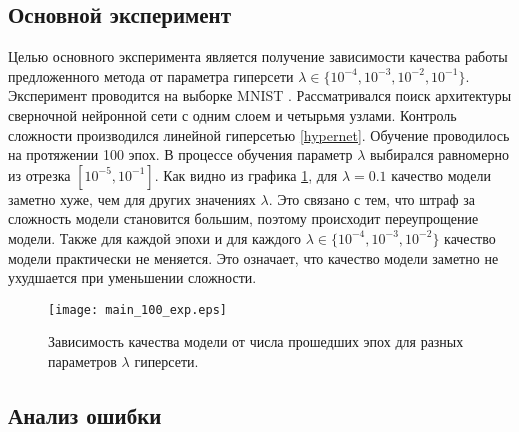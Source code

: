 \documentclass[12pt, twoside]{article}
\begin{document}
\subsection{Основной эксперимент}

Целью основного эксперимента является получение зависимости качества работы предложенного метода от параметра гиперсети $\lambda \in \{10^{-4}, 10^{-3}, 10^{-2}, 10^{-1}\}$. Эксперимент проводится на выборке MNIST \cite{lecun-mnisthandwrittendigit-2010}. Рассматривался поиск архитектуры сверночной нейронной сети с одним слоем и четырьмя узлами. Контроль сложности производился линейной гиперсетью \ref{hypernet}. Обучение проводилось на протяжении 100 эпох. В процессе обучения параметр $\lambda$ выбирался равномерно из отрезка $[10^{-5}, 10^{-1}]$. Как видно из графика \ref{fig:main_exp}, для $\lambda = 0.1$ качество модели заметно хуже, чем для других значениях $\lambda$. Это связано с тем, что штраф за сложность модели становится большим, поэтому происходит переупрощение модели. Также для каждой эпохи и для каждого $\lambda \in \{10^{-4}, 10^{-3}, 10^{-2}\}$ качество модели практически не меняется. Это означает, что качество модели заметно не ухудшается при уменьшении сложности.

\begin{figure}[H]
\centering
  \texttt{[image: main\_100\_exp.eps]}
  \caption{Зависимость качества модели от числа прошедших эпох для разных параметров $\lambda$ гиперсети.}
  \label{fig:main_exp}
\end{figure}

\subsection{Анализ ошибки}
\end{document}
